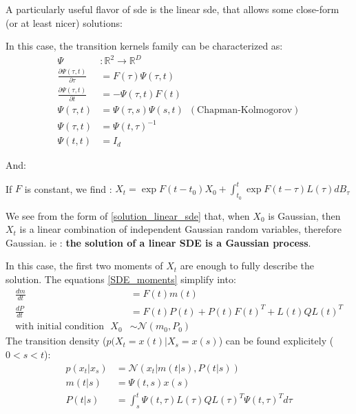 A particularly useful flavor of \gls{sde} is the linear \gls{sde}, that allows some close-form (or at least nicer) solutions:


In this case, the transition kernels family can be characterized as:
\begin{align}
    \Psi &: \mathbb{R}^{2 } \rightarrow \mathbb{R}^{D} \\
    \frac{\partial \Psi (\tau, t)}{\partial \tau} &= F(\tau) \Psi(\tau, t) \\
    \frac{\partial \Psi (\tau, t)}{\partial t} &= - \Psi(\tau, t) F(t)  \\
    \Psi(\tau, t) &= \Psi(\tau, s) \Psi(s, t) \,\,\, (\text{Chapman-Kolmogorov}) \\
    \Psi(\tau, t) &= \Psi(t, \tau)^{-1} \\ 
    \Psi(t,t) &= I_d
\end{align}

And:

If $F$ is constant, we find : $X_t = \exp{F(t-t_0)}X_0 + \int_{t_0}^{t} \exp{F(t- \tau)}L(\tau)dB_{\tau}$

We see from the form of \ref{solution_linear_sde} that, when $X_0$ is Gaussian, then $X_t$ is a linear combination of 
independent Gaussian random variables, therefore Gaussian. ie : \textbf{the solution of a linear SDE is a Gaussian process}.

In this case, the first two moments of $X_t$ are enough to fully describe the solution. The equations \ref{SDE_moments} simplify into:
\begin{align}
    \label{SDE_linear_moments}
    \frac{dm}{dt} &= F(t) m(t) \\
    \frac{dP}{dt} &= F(t)P(t) + P(t)F(t)^{T} + L(t)QL(t)^{T} \\
    \text{with initial condition } \,\, X_0 &\sim \mathcal{N}(m_0, P_0)
\end{align}
The transition density ($p(X_t = x(t) \vert X_s = x(s)$) can be found explicitely ($0 < s < t$):
\begin{align}
    p(x_t \vert x_s) &= \mathcal{N}(x_t \vert m(t\vert s), P(t \vert s)) \\
    m(t \vert s) &= \Psi(t,s)x(s) \\
    P(t \vert s) &= \int_{s}^{t} \Psi(t,\tau)L(\tau)Q L(\tau)^{T}\Psi(t, \tau)^{T} d\tau
\end{align}

